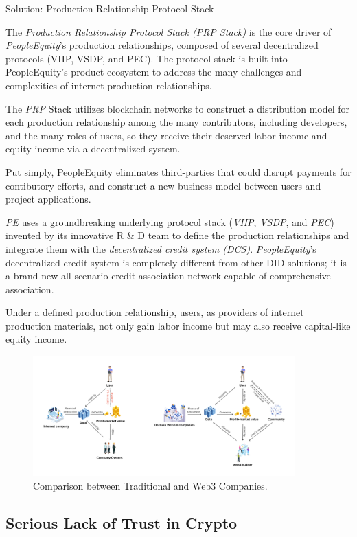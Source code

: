 \documentclass{article}
\begin{document}
Solution: Production Relationship Protocol Stack

The \emph{Production Relationship Protocol Stack (PRP Stack)} is the core driver of \emph{PeopleEquity}'s production relationships, composed of several decentralized protocols (VIIP, VSDP, and PEC). The protocol stack is built into PeopleEquity's product ecosystem to address the many challenges and complexities of internet production relationships. 

The \emph{PRP} Stack utilizes blockchain networks to construct a distribution model for each production relationship among the many contributors, including developers, and the many roles of users, so they receive their deserved labor income and equity income via a decentralized system.

Put simply, PeopleEquity eliminates third-parties that could disrupt payments for contibutory efforts, and construct a new business model between users and project applications.

\emph{PE} uses a groundbreaking underlying protocol stack (\emph{VIIP}, \emph{VSDP}, and \emph{PEC}) invented by its innovative R \& D team to define the production relationships and integrate them with the \emph{decentralized credit system (DCS)}. \emph{PeopleEquity}'s decentralized credit system is completely different from other DID solutions; it is a brand new all-scenario credit association network capable of comprehensive association.

Under a defined production relationship, users, as providers of internet production materials, not only gain labor income but may also receive capital-like equity income.


\begin{figure}
\centering
\includegraphics[width=0.9\textwidth]{./img/comparison_prp.png}
\caption{\label{fig}Comparison between Traditional and Web3 Companies.}
\end{figure}


\subsection{Serious Lack of Trust in Crypto}
\end{document}
